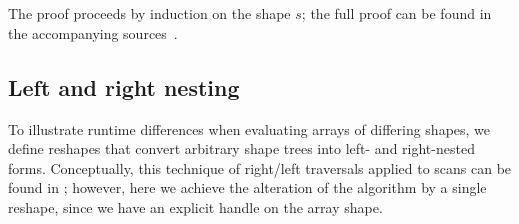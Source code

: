 \begin{code}[hide]
\AgdaSpace{}%
\AgdaSymbol{))}\AgdaSpace{}%
\<%
\\
%
\>[6]\AgdaSpace{}%
\AgdaSymbol{=}\AgdaSpace{}%
\AgdaSpace{}%
\AgdaSpace{}%
\AgdaSpace{}%
\AgdaSpace{}%
\AgdaSpace{}%
\AgdaSpace{}%
\AgdaSpace{}%
\AgdaSpace{}%
\AgdaSpace{}%
\AgdaSpace{}%
\AgdaSpace{}%
\AgdaSymbol{(}\AgdaSpace{}%
\AgdaSpace{}%
\AgdaSymbol{))}\<%
\\
%
\>[6]\AgdaSpace{}%
\AgdaSymbol{=}\AgdaSpace{}%
\AgdaSpace{}%
\AgdaSpace{}%
\AgdaSpace{}%
\AgdaSpace{}%
\AgdaSymbol{(}\AgdaSpace{}%
\AgdaSpace{}%
\AgdaSpace{}%
\AgdaSpace{}%
\AgdaSpace{}%
\AgdaSpace{}%
\AgdaSpace{}%
\AgdaSpace{}%
\AgdaSymbol{(}\AgdaSpace{}%
\AgdaSpace{}%
\AgdaSymbol{)))}\<%
\end{code}
The proof proceeds by induction on the shape $s$; the full proof can be found
in the accompanying sources~\citep{paper-src}.

\subsection{Left and right nesting}
To illustrate runtime differences when evaluating arrays of differing shapes,
we define reshapes that convert arbitrary shape trees into left- and
right-nested forms.  Conceptually, this technique of right/left traversals
applied to scans can be found in \citet{Elliott:scan}; however, here we achieve
the alteration of the algorithm by a single reshape, since we have an explicit
handle on the array shape.

